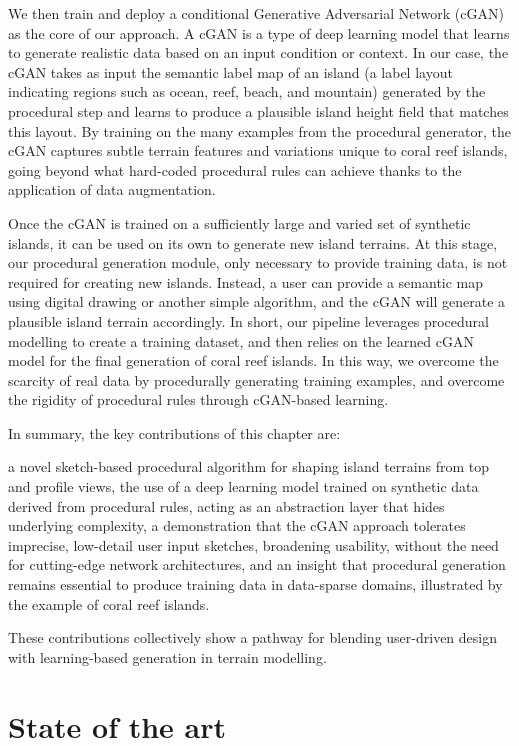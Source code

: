 We then train and deploy a conditional Generative Adversarial Network (cGAN) as the core of our approach. A cGAN is a type of deep learning model that learns to generate realistic data based on an input condition or context. In our case, the cGAN takes as input the semantic label map of an island (a label layout indicating regions such as ocean, reef, beach, and mountain) generated by the procedural step and learns to produce a plausible island height field that matches this layout. By training on the many examples from the procedural generator, the cGAN captures subtle terrain features and variations unique to coral reef islands, going beyond what hard-coded procedural rules can achieve thanks to the application of data augmentation.

Once the cGAN is trained on a sufficiently large and varied set of synthetic islands, it can be used on its own to generate new island terrains. At this stage, our procedural generation module, only necessary to provide training data, is not required for creating new islands. Instead, a user can provide a semantic map using digital drawing or another simple algorithm, and the cGAN will generate a plausible island terrain accordingly. In short, our pipeline leverages procedural modelling to create a training dataset, and then relies on the learned cGAN model for the final generation of coral reef islands. In this way, we overcome the scarcity of real data by procedurally generating training examples, and overcome the rigidity of procedural rules through cGAN-based learning.


In summary, the key contributions of this chapter are:
\begin{Itemize}
    \Item{} a novel sketch-based procedural algorithm for shaping island terrains from top and profile views,
    \Item{} the use of a deep learning model trained on synthetic data derived from procedural rules, acting as an abstraction layer that hides underlying complexity,
    \Item{} a demonstration that the cGAN approach tolerates imprecise, low-detail user input sketches, broadening usability, without the need for cutting-edge network architectures,
    \Item{} and an insight that procedural generation remains essential to produce training data in data-sparse domains, illustrated by the example of coral reef islands.
\end{Itemize}
These contributions collectively show a pathway for blending user-driven design with learning-based generation in terrain modelling.

\section{State of the art}
\label{sec:coral-island-SotA}

